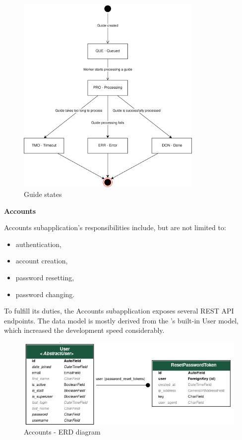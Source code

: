 \begin{figure}[H]
  \caption{Guide states}
  \centering
    \includegraphics[width=0.8\textwidth]{assets/3-guide-states.png}
\end{figure}


\medskip

\textbf{Accounts}

Accounts subapplication's responsibilities include, but are not limited to:
\begin{itemize}
	\item authentication,
	\item account creation,
	\item password resetting,
	\item password changing.
\end{itemize}

To fulfill its duties, the Accounts subapplication exposes several REST API endpoints.
The data model is mostly derived from the 's built-in User model, which increased the development speed considerably.
\medskip

 
\begin{figure}[H]
  \caption{Accounts - ERD diagram}
  \centering
    \includegraphics[width=\textwidth]{assets/3-erd-accounts.png}
\end{figure}




